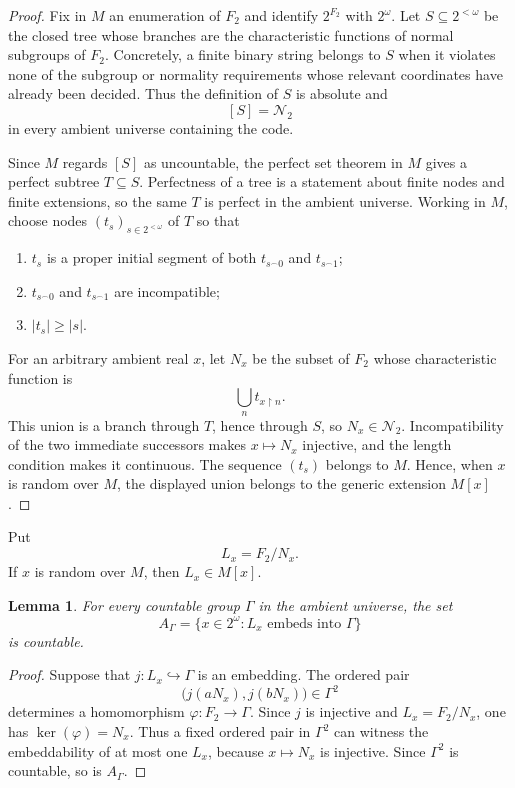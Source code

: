 \documentclass[11pt]{amsart}
\newtheorem{lemma}[theorem]{Lemma}
\theoremstyle{definition}
\theoremstyle{remark}
\newcommand{\restr}{\mathbin{\upharpoonright}}
\begin{document}
\begin{proof}
Fix in $M$ an enumeration of $F_2$ and identify $2^{F_2}$ with $2^\omega$.  Let $S\subseteq2^{<\omega}$ be the closed tree whose branches are the characteristic functions of normal subgroups of $F_2$.  Concretely, a finite binary string belongs to $S$ when it violates none of the subgroup or normality requirements whose relevant coordinates have already been decided.  Thus the definition of $S$ is absolute and
\[
 [S]=\mathcal N_2
\]
in every ambient universe containing the code.

Since $M$ regards $[S]$ as uncountable, the perfect set theorem in $M$ gives a perfect subtree $T\subseteq S$.  Perfectness of a tree is a statement about finite nodes and finite extensions, so the same $T$ is perfect in the ambient universe.  Working in $M$, choose nodes $(t_s)_{s\in2^{<\omega}}$ of $T$ so that
\begin{enumerate}
\item $t_s$ is a proper initial segment of both $t_{s^\frown0}$ and $t_{s^\frown1}$;
\item $t_{s^\frown0}$ and $t_{s^\frown1}$ are incompatible;
\item $|t_s|\geq |s|$.
\end{enumerate}
For an arbitrary ambient real $x$, let $N_x$ be the subset of $F_2$ whose characteristic function is
\[
 \bigcup_n t_{x\restr n}.
\]
This union is a branch through $T$, hence through $S$, so $N_x\in\mathcal N_2$.  Incompatibility of the two immediate successors makes $x\mapsto N_x$ injective, and the length condition makes it continuous.  The sequence $(t_s)$ belongs to $M$.  Hence, when $x$ is random over $M$, the displayed union belongs to the generic extension $M[x]$.
\end{proof}


Put
\[
 L_x=F_2/N_x.
\]
If $x$ is random over $M$, then $L_x\in M[x]$.

\begin{lemma}\label{lem:target-avoidance}
For every countable group $\Gamma$ in the ambient universe, the set
\[
 A_\Gamma=\{x\in2^\omega:L_x\text{ embeds into }\Gamma\}
\]
is countable.
\end{lemma}

\begin{proof}
Suppose that $j\colon L_x\hookrightarrow\Gamma$ is an embedding.  The ordered pair
\[
 \bigl(j(aN_x),j(bN_x)\bigr)\in\Gamma^2
\]
determines a homomorphism $\varphi\colon F_2\to\Gamma$.  Since $j$ is injective and $L_x=F_2/N_x$, one has $\ker(\varphi)=N_x$.  Thus a fixed ordered pair in $\Gamma^2$ can witness the embeddability of at most one $L_x$, because $x\mapsto N_x$ is injective.  Since $\Gamma^2$ is countable, so is $A_\Gamma$.
\end{proof}
\end{document}
